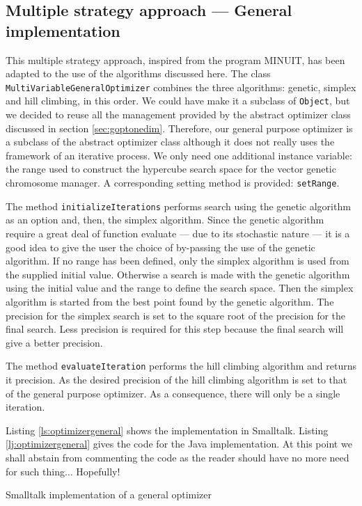 \documentclass[twoside]{book}
\begin{document}
\subsection{Multiple strategy approach --- General implementation}
This multiple strategy approach, inspired from the program MINUIT,
has been adapted to the use of the algorithms discussed here. The
class {\tt MultiVariableGeneralOptimizer} combines the three
algorithms: genetic, simplex and hill climbing, in this order. We
could have make it a subclass of {\tt Object}, but we decided to
reuse all the management provided by the abstract optimizer class
discussed in section \ref{sec:goptonedim}. Therefore, our general
purpose optimizer is a subclass of the abstract optimizer class
although it does not really uses the framework of an iterative
process. We only need one additional instance variable: the range
used to construct the hypercube search space for the vector
genetic chromosome manager. A corresponding setting method is
provided: {\tt setRange}.

The method {\tt initializeIterations} performs search using the
genetic algorithm as an option and, then, the simplex algorithm.
Since the genetic algorithm require a great deal of function
evaluate --- due to its stochastic nature --- it is a good idea to
give the user the choice of by-passing the use of the genetic
algorithm. If no range has been defined, only the simplex
algorithm is used from the supplied initial value. Otherwise a
search is made with the genetic algorithm using the initial value
and the range to define the search space. Then the simplex
algorithm is started from the best point found by the genetic
algorithm. The precision for the simplex search is set to the
square root of the precision for the final search. Less precision
is required for this step because the final search will give a
better precision.

The method {\tt evaluateIteration} performs the hill climbing
algorithm and returns it precision. As the desired precision of
the hill climbing algorithm is set to that of the general purpose
optimizer. As a consequence, there will only be a single
iteration.

Listing \ref{ls:optimizergeneral} shows the implementation in
Smalltalk. Listing \ref{lj:optimizergeneral} gives the code for
the Java implementation. At this point we shall abstain from
commenting the code as the reader should have no more need for
such thing$\ldots$ Hopefully!

\begin{listing} Smalltalk
implementation of a general optimizer \label{ls:optimizergeneral}

\end{listing}

\ifx\wholebook\relax\else
\end{document}
